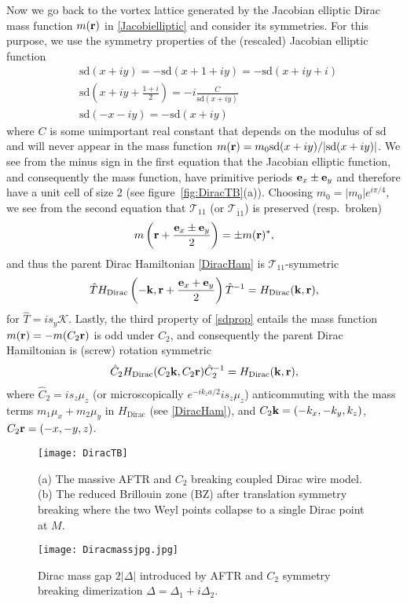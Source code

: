 Now we go back to the vortex lattice generated by the Jacobian elliptic Dirac mass function $m({\bf r})$ in \eqref{Jacobielliptic} and consider its symmetries. For this purpose, we use the symmetry properties of the (rescaled) Jacobian elliptic function~\cite{ReinhardtWalker10} \begin{align}&\mathrm{sd}(x+iy)=-\mathrm{sd}(x+1+iy)=-\mathrm{sd}(x+iy+i)\nonumber\\&\mathrm{sd}\left(x+iy+\frac{1+i}{2}\right)=-i\frac{C}{\mathrm{sd}(x+iy)}\label{sdprop}\\&\mathrm{sd}(-x-iy)=-\mathrm{sd}(x+iy)\nonumber\end{align} where $C$ is some unimportant real constant that depends on the modulus of $\mathrm{sd}$ and will never appear in the mass function $m({\bf r})=m_0\mathrm{sd}(x+iy)/|\mathrm{sd}(x+iy)|$. We see from the minus sign in the first equation that the Jacobian elliptic function, and consequently the mass function, have primitive periods ${\bf e}_x\pm{\bf e}_y$ and therefore have a unit cell of size 2 (see figure~\ref{fig:DiracTB}(a)). Choosing $m_0=|m_0|e^{i\pi/4}$, we see from the second equation that $\mathcal{T}_{11}$ (or $\mathcal{T}_{\bar{1}1}$) is preserved (resp.~broken) \begin{align}m\left({\bf r}+\frac{{\bf e}_x\pm{\bf e}_y}{2}\right)=\pm m({\bf r})^\ast,\label{massT11}\end{align} and thus the parent Dirac Hamiltonian \eqref{DiracHam} is $\mathcal{T}_{11}$-symmetric \begin{align}\hat{T}H_{\mathrm{Dirac}}\left(-{\bf k},{\bf r}+\frac{{\bf e}_x+{\bf e}_y}{2}\right)\hat{T}^{-1}=H_{\mathrm{Dirac}}({\bf k},{\bf r}),\end{align} for $\hat{T}=is_y\mathcal{K}$. Lastly, the third property of \eqref{sdprop} entails the mass function $m({\bf r})=-m(C_2{\bf r})$ is odd under $C_2$, and consequently the parent Dirac Hamiltonian is (screw) rotation symmetric \begin{align}\hat{C}_2H_{\mathrm{Dirac}}(C_2{\bf k},C_2{\bf r})\hat{C}_2^{-1}=H_{\mathrm{Dirac}}({\bf k},{\bf r}),\label{massC2}\end{align} where $\hat{C}_2=is_z\mu_z$ (or microscopically $e^{-ik_za/2}is_z\mu_z$) anticommuting with the mass terms $m_1\mu_x+m_2\mu_y$ in $H_{\mathrm{Dirac}}$ (see \eqref{DiracHam}), and $C_2{\bf k}=(-k_x,-k_y,k_z)$, $C_2{\bf r}=(-x,-y,z)$.

\begin{figure}[htbp]
\centering\texttt{[image: DiracTB]}
\caption{(a) The massive AFTR and $C_2$ breaking coupled Dirac wire model. (b) The reduced Brillouin zone (BZ) after translation symmetry breaking where the two Weyl points collapse to a single Dirac point at $M$.}\label{fig:DiracTB}
\centering\texttt{[image: Diracmassjpg.jpg]}
\caption{Dirac mass gap $2|\Delta|$ introduced by AFTR and $C_2$ symmetry breaking dimerization $\Delta=\Delta_1+i\Delta_2$.}\label{fig:Diracmassjpg}
\end{figure}

